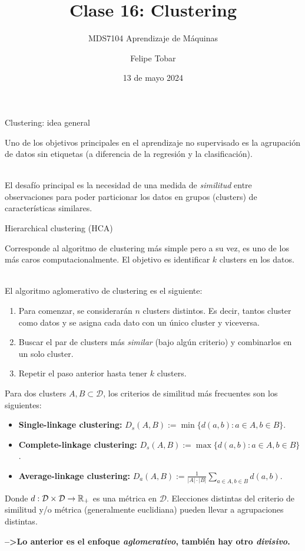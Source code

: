 \documentclass[handout, 9pt]{beamer}
\title{Clase 16: Clustering}
\subtitle{MDS7104 Aprendizaje de Máquinas}
\date{13 de mayo 2024}
\author{Felipe Tobar}
\institute{Iniciativa de Datos e Inteligencia Artificial\\Universidad de Chile}
\begin{document}
\begin{frame}
  \titlepage
\end{frame}

\begin{frame}{Clustering: idea general}
	
	Uno de los objetivos principales en el aprendizaje no supervisado es la agrupación de datos sin  etiquetas (a diferencia de la regresión y la clasificación).\\~\
	
	\pause
	El desafío principal es la necesidad de una medida de \emph{similitud} 	entre observaciones para poder particionar los datos en grupos (clusters) de características similares.
	
\end{frame}

\begin{frame}{Hierarchical clustering (HCA)}
	
	Corresponde al algoritmo de clustering más simple pero a su vez, es uno de los más caros computacionalmente. El objetivo es identificar $k$ clusters en los datos. \\~\ \pause

 El algoritmo aglomerativo de clustering es el siguiente:

\begin{enumerate}
	\item Para comenzar, se considerarán $n$ clusters distintos. Es decir, tantos cluster como datos y se asigna cada dato con un único cluster y viceversa.\pause
	\item Buscar el par de clusters más \emph{similar} (bajo algún criterio) y combinarlos en un solo cluster.\pause
	\item Repetir el paso anterior hasta tener $k$ clusters.
\end{enumerate}
\pause
Para dos clusters $A,B\subset\mathcal{D}$, los criterios de similitud más frecuentes son los siguientes:

\begin{itemize}
	\item \textbf{Single-linkage clustering:} $D_s(A,B):=\min\{d(a,b):a\in A, b\in B\}$.\pause
	\item \textbf{Complete-linkage clustering:} $D_s(A,B):=\max\{d(a,b):a\in A, b\in B\}$.\pause
	\item \textbf{Average-linkage clustering:} $D_a(A,B):=\frac{1}{|A|\cdot|B|}\sum_{a\in A, b\in B} d(a,b)$.\pause
\end{itemize}

Donde $d:\mathcal{D}\times \mathcal{D}\to \mathbb{R}_+$ es una métrica en $\mathcal{D}$. Elecciones distintas del criterio de similitud y/o métrica (generalmente euclidiana) pueden llevar a agrupaciones distintas.
	
\textbf{-->Lo anterior es el enfoque \emph{aglomerativo}, también hay otro \emph{divisivo}.}	
\end{frame}
\end{document}
